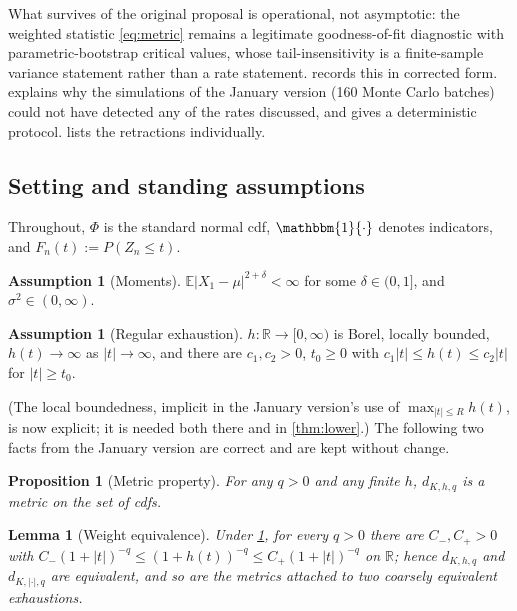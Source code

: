 \documentclass[11pt,a4paper]{article}
\theoremstyle{plain}
\newtheorem{lemma}[theorem]{Lemma}
\newtheorem{proposition}[theorem]{Proposition}
\theoremstyle{definition}
\newtheorem{assumption}[theorem]{Assumption}
\theoremstyle{remark}
\numberwithin{equation}{section}
\newcommand{\R}{\mathbb{R}}
\newcommand{\E}{\mathbb{E}}
\newcommand{\1}{\mathbbm{1}}
\newcommand{\h}{h}
\begin{document}
What survives of the original proposal is operational, not asymptotic: the weighted
statistic \eqref{eq:metric} remains a legitimate goodness-of-fit diagnostic with
parametric-bootstrap critical values, whose tail-insensitivity is a finite-sample
variance statement rather than a rate statement.  records this in
corrected form.  explains why the simulations of the January version
(160 Monte Carlo batches) could not have detected any of the rates discussed, and gives
a deterministic protocol.  lists the retractions individually.

\subsection{Setting and standing assumptions}

Throughout, $\Phi$ is the standard normal cdf, $\1\{\cdot\}$ denotes indicators, and
$F_n(t):=P(Z_n\le t)$.

\begin{assumption}[Moments]\label{ass:moment}
$\E|X_1-\mu|^{2+\delta}<\infty$ for some $\delta\in(0,1]$, and
$\sigma^2\in(0,\infty)$.
\end{assumption}

\begin{assumption}[Regular exhaustion]\label{ass:h}
$\h:\R\to[0,\infty)$ is Borel, locally bounded, $\h(t)\to\infty$ as $|t|\to\infty$, and
there are $c_1,c_2>0$, $t_0\ge0$ with $c_1|t|\le \h(t)\le c_2|t|$ for $|t|\ge t_0$.
\end{assumption}

(The local boundedness, implicit in the January version's use of
$\max_{|t|\le R}\h(t)$, is now explicit; it is needed both there and in
\cref{thm:lower}.) The following two facts from the January version are correct and are
kept without change.

\begin{proposition}[Metric property]\label{prop:metric}
For any $q>0$ and any finite $\h$, $d_{K,\h,q}$ is a metric on the set of cdfs.
\end{proposition}

\begin{lemma}[Weight equivalence]\label{lem:weight-equiv}
Under \cref{ass:h}, for every $q>0$ there are $C_-,C_+>0$ with
$C_-(1+|t|)^{-q}\le(1+\h(t))^{-q}\le C_+(1+|t|)^{-q}$ on $\R$; hence
$d_{K,\h,q}$ and $d_{K,|\cdot|,q}$ are equivalent, and so are the metrics attached to
two coarsely equivalent exhaustions.
\end{lemma}
\end{document}
